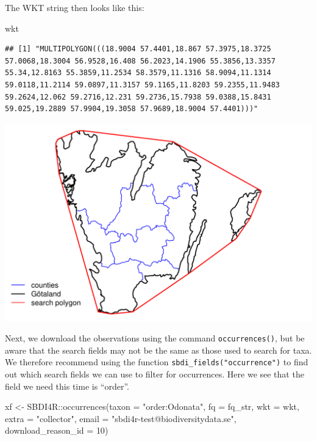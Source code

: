 \documentclass[
  10pt,
]{article}
\newenvironment{Shaded}{\begin{snugshade}}{\end{snugshade}}
\newcommand{\AttributeTok}[1]{\textcolor[rgb]{0.77,0.63,0.00}{#1}}
\newcommand{\DecValTok}[1]{\textcolor[rgb]{0.00,0.00,0.81}{#1}}
\newcommand{\FunctionTok}[1]{\textcolor[rgb]{0.00,0.00,0.00}{#1}}
\newcommand{\NormalTok}[1]{#1}
\newcommand{\OtherTok}[1]{\textcolor[rgb]{0.56,0.35,0.01}{#1}}
\newcommand{\SpecialCharTok}[1]{\textcolor[rgb]{0.00,0.00,0.00}{#1}}
\newcommand{\StringTok}[1]{\textcolor[rgb]{0.31,0.60,0.02}{#1}}
\begin{document}
The WKT string then looks like this:

\begin{Shaded}
\begin{Highlighting}[]
\NormalTok{wkt}
\end{Highlighting}
\end{Shaded}

\begin{verbatim}
## [1] "MULTIPOLYGON(((18.9004 57.4401,18.867 57.3975,18.3725 57.0068,18.3004 56.9528,16.408 56.2023,14.1906 55.3856,13.3357 55.34,12.8163 55.3859,11.2534 58.3579,11.1316 58.9094,11.1314 59.0118,11.2114 59.0897,11.3157 59.1165,11.8203 59.2355,11.9483 59.2624,12.062 59.2716,12.231 59.2736,15.7938 59.0388,15.8431 59.025,19.2889 57.9904,19.3058 57.9689,18.9004 57.4401)))"
\end{verbatim}

\includegraphics{r-tools-tutorial_files/figure-latex/searchpoly-1.pdf}

Next, we download the observations using the command \texttt{occurrences()}, but be aware that
the search fields may not be the same as those used to search for taxa. We therefore
recommend using the function \texttt{sbdi\_fields("occurrence")} to find out which search fields we can use
to filter for occurrences. Here we see that the field
we need this time is ``order''.

\begin{Shaded}
\begin{Highlighting}[]
\NormalTok{xf }\OtherTok{\textless{}{-}}\NormalTok{ SBDI4R}\SpecialCharTok{::}\FunctionTok{occurrences}\NormalTok{(}\AttributeTok{taxon =} \StringTok{"order:Odonata"}\NormalTok{, }
                  \AttributeTok{fq =}\NormalTok{ fq\_str,}
                  \AttributeTok{wkt =}\NormalTok{ wkt,}
                  \AttributeTok{extra =} \StringTok{"collector"}\NormalTok{,}
                  \AttributeTok{email =} \StringTok{"sbdi4r{-}test@biodiversitydata.se"}\NormalTok{, }
                  \AttributeTok{download\_reason\_id =} \DecValTok{10}\NormalTok{)}
\end{Highlighting}
\end{Shaded}
\end{document}
